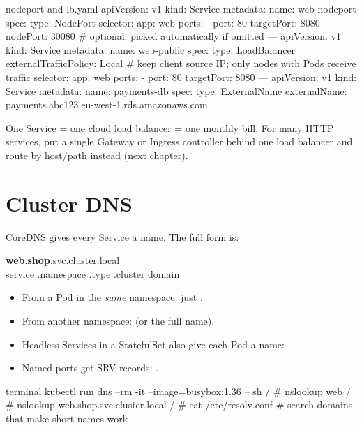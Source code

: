 \begin{yamlcode}{nodeport-and-lb.yaml}
apiVersion: v1
kind: Service
metadata:
  name: web-nodeport
spec:
  type: NodePort
  selector: { app: web }
  ports:
    - port: 80
      targetPort: 8080
      nodePort: 30080         # optional; picked automatically if omitted
---
apiVersion: v1
kind: Service
metadata:
  name: web-public
spec:
  type: LoadBalancer
  externalTrafficPolicy: Local   # keep client source IP; only nodes with Pods receive traffic
  selector: { app: web }
  ports:
    - port: 80
      targetPort: 8080
---
apiVersion: v1
kind: Service
metadata:
  name: payments-db
spec:
  type: ExternalName
  externalName: payments.abc123.eu-west-1.rds.amazonaws.com
\end{yamlcode}

\begin{warningbox}
One  Service = one cloud load balancer = one monthly bill. For
many HTTP services, put a single Gateway or Ingress controller behind one load
balancer and route by host/path instead (next chapter).
\end{warningbox}

\section{Cluster DNS}

CoreDNS gives every Service a name. The full form is:

\begin{center}
\colorbox{k8slight}{\large\ttfamily
\textcolor{k8sblue}{\bfseries web}.\textcolor{k8sdeep}{\bfseries shop}.\textcolor{k8snavy}{svc}.\textcolor{k8sgray}{cluster.local}}\\[4pt]
\footnotesize service \quad.\quad namespace \quad.\quad type \quad.\quad cluster domain
\end{center}

\begin{itemize}
  \item From a Pod in the \emph{same} namespace: just .
  \item From another namespace:  (or the full name).
  \item Headless Services in a StatefulSet also give each Pod a name:
        .
  \item Named ports get SRV records: .
\end{itemize}

\begin{bashcode}{terminal}
kubectl run dns --rm -it --image=busybox:1.36 -- sh
/ # nslookup web
/ # nslookup web.shop.svc.cluster.local
/ # cat /etc/resolv.conf        # search domains that make short names work
\end{bashcode}

